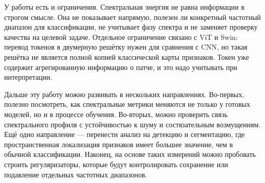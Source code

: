 У работы есть и ограничения. Спектральная энергия не равна информации в строгом смысле. Она не показывает напрямую, полезен ли конкретный частотный диапазон для классификации, не учитывает фазу спектра и не заменяет проверку качества на целевой задаче. Отдельное ограничение связано с ViT и Swin: перевод токенов в двумерную решётку нужен для сравнения с CNN, но такая решётка не является полной копией классической карты признаков. Токен уже содержит агрегированную информацию о патче, и это надо учитывать при интерпретации.

Дальше эту работу можно развивать в нескольких направлениях. Во-первых, полезно посмотреть, как спектральные метрики меняются не только у готовых моделей, но и в процессе обучения. Во-вторых, можно проверить связь спектрального профиля с устойчивостью к шуму и состязательным возмущениям. Ещё одно направление — перенести анализ на детекцию и сегментацию, где пространственная локализация признаков имеет большее значение, чем в обычной классификации. Наконец, на основе таких измерений можно пробовать строить регуляризаторы, которые будут контролировать сохранение или подавление отдельных частотных диапазонов.
